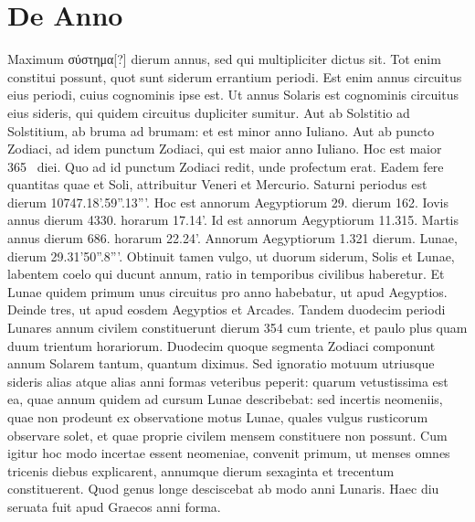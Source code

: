 \section{De Anno}
Maximum \textgreek{σύστημα[?]}
 dierum annus, sed qui multipliciter dictus
sit.
Tot enim constitui possunt, quot sunt siderum errantium
periodi.
Est enim annus circuitus eius periodi, cuius cognominis
ipse est.
Ut annus Solaris est cognominis circuitus eius sideris,
qui quidem circuitus dupliciter sumitur.
Aut ab Solstitio ad Solstitium,
ab bruma ad brumam: et est minor anno Iuliano.
Aut ab puncto Zodiaci,
ad idem punctum Zodiaci, qui est maior anno Iuliano.
Hoc est maior 365~ diei.
Quo ad id punctum Zodiaci redit, unde profectum
erat.
Eadem fere quantitas quae et Soli, attribuitur Veneri et Mercurio.
Saturni periodus est dierum 10747.18'.59''.13'''.
Hoc est annorum
Aegyptiorum 29. dierum 162.
Iovis annus dierum 4330. horarum 17.14'.
Id est annorum Aegyptiorum 11.315.
Martis annus dierum
686. horarum 22.24'.
Annorum Aegyptiorum 1.321 dierum.
Lunae,
dierum 29.31'50''.8'''.
Obtinuit tamen vulgo, ut duorum siderum,
Solis et Lunae, labentem coelo qui ducunt annum, ratio in temporibus
civilibus haberetur.
Et Lunae quidem primum unus circuitus
pro anno habebatur, ut apud Aegyptios.
Deinde tres, ut apud eosdem
Aegyptios et Arcades.
Tandem duodecim periodi Lunares annum
civilem constituerunt dierum 354 cum triente, et paulo plus quam
duum trientum horariorum.
Duodecim quoque segmenta Zodiaci
componunt annum Solarem tantum, quantum diximus.
Sed ignoratio
motuum utriusque sideris alias atque alias anni formas veteribus
peperit:
%
quarum vetustissima est ea, quae annum quidem ad cursum
Lunae describebat:
sed incertis neomeniis, quae non prodeunt ex observatione
motus Lunae, quales vulgus rusticorum observare solet, et
quae proprie civilem mensem constituere non possunt.
Cum igitur
hoc modo incertae essent neomeniae, convenit primum, ut menses omnes
tricenis diebus explicarent, annumque dierum sexaginta et trecentum
constituerent.
Quod genus longe desciscebat ab modo anni
Lunaris.
Haec diu seruata fuit apud Graecos anni forma.
